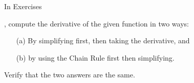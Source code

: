 {\noindent In Exercises}
{, compute the derivative of the given function in two ways:
\begin{enumerate}
\item[(a)] By simplifying first, then taking the derivative, and
\item [(b)] by using the Chain Rule first then simplifying.
\end{enumerate}
Verify that the two answers are the same.}
